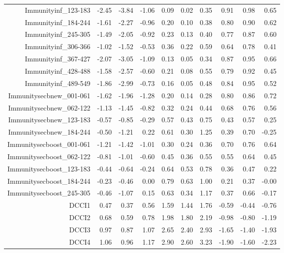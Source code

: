 \begin{table}[ht]
\begin{tabular}{rrrrrrrrrr}
  Immunityinf\_123-183 & -2.45 & -3.84 & -1.06 & 0.09 & 0.02 & 0.35 & 0.91 & 0.98 & 0.65 \\ 
  Immunityinf\_184-244 & -1.61 & -2.27 & -0.96 & 0.20 & 0.10 & 0.38 & 0.80 & 0.90 & 0.62 \\ 
  Immunityinf\_245-305 & -1.49 & -2.05 & -0.92 & 0.23 & 0.13 & 0.40 & 0.77 & 0.87 & 0.60 \\ 
  Immunityinf\_306-366 & -1.02 & -1.52 & -0.53 & 0.36 & 0.22 & 0.59 & 0.64 & 0.78 & 0.41 \\ 
  Immunityinf\_367-427 & -2.07 & -3.05 & -1.09 & 0.13 & 0.05 & 0.34 & 0.87 & 0.95 & 0.66 \\ 
  Immunityinf\_428-488 & -1.58 & -2.57 & -0.60 & 0.21 & 0.08 & 0.55 & 0.79 & 0.92 & 0.45 \\ 
  Immunityinf\_489-549 & -1.86 & -2.99 & -0.73 & 0.16 & 0.05 & 0.48 & 0.84 & 0.95 & 0.52 \\ 
  Immunitysecbnew\_001-061 & -1.62 & -1.96 & -1.28 & 0.20 & 0.14 & 0.28 & 0.80 & 0.86 & 0.72 \\ 
  Immunitysecbnew\_062-122 & -1.13 & -1.45 & -0.82 & 0.32 & 0.24 & 0.44 & 0.68 & 0.76 & 0.56 \\ 
  Immunitysecbnew\_123-183 & -0.57 & -0.85 & -0.29 & 0.57 & 0.43 & 0.75 & 0.43 & 0.57 & 0.25 \\ 
  Immunitysecbnew\_184-244 & -0.50 & -1.21 & 0.22 & 0.61 & 0.30 & 1.25 & 0.39 & 0.70 & -0.25 \\ 
  Immunitysecboost\_001-061 & -1.21 & -1.42 & -1.01 & 0.30 & 0.24 & 0.36 & 0.70 & 0.76 & 0.64 \\ 
  Immunitysecboost\_062-122 & -0.81 & -1.01 & -0.60 & 0.45 & 0.36 & 0.55 & 0.55 & 0.64 & 0.45 \\ 
  Immunitysecboost\_123-183 & -0.44 & -0.64 & -0.24 & 0.64 & 0.53 & 0.78 & 0.36 & 0.47 & 0.22 \\ 
  Immunitysecboost\_184-244 & -0.23 & -0.46 & 0.00 & 0.79 & 0.63 & 1.00 & 0.21 & 0.37 & -0.00 \\ 
  Immunitysecboost\_245-305 & -0.46 & -1.07 & 0.15 & 0.63 & 0.34 & 1.17 & 0.37 & 0.66 & -0.17 \\ 
  DCCI1 & 0.47 & 0.37 & 0.56 & 1.59 & 1.44 & 1.76 & -0.59 & -0.44 & -0.76 \\ 
  DCCI2 & 0.68 & 0.59 & 0.78 & 1.98 & 1.80 & 2.19 & -0.98 & -0.80 & -1.19 \\ 
  DCCI3 & 0.97 & 0.87 & 1.07 & 2.65 & 2.40 & 2.93 & -1.65 & -1.40 & -1.93 \\ 
  DCCI4 & 1.06 & 0.96 & 1.17 & 2.90 & 2.60 & 3.23 & -1.90 & -1.60 & -2.23 \\ 

\end{tabular}
\end{table}
